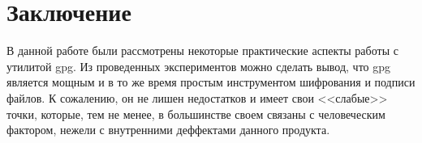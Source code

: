 \section{Заключение}

В данной работе были рассмотрены некоторые практические аспекты работы с утилитой gpg. Из проведенных экспериментов можно сделать
вывод, что gpg является мощным и в то же время простым инструментом шифрования и подписи файлов. К сожалению, он не лишен недостатков 
и имеет свои <<слабые>> точки, которые, тем не менее, в большинстве своем связаны с человеческим фактором, нежели с внутренними 
деффектами данного продукта.